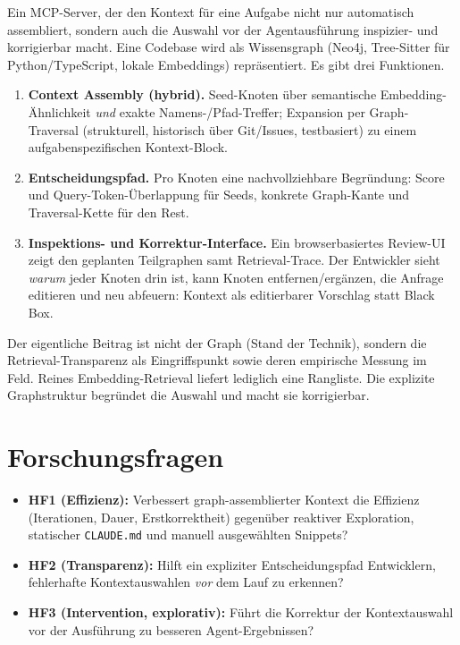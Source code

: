 \documentclass[11pt,a4paper]{scrartcl}
\newcommand{\code}[1]{\texttt{#1}}
\begin{document}
Ein MCP-Server, der den Kontext für eine Aufgabe nicht nur automatisch assembliert,
 sondern auch die Auswahl vor der Agentausführung inspizier- und korrigierbar macht. 
 Eine Codebase wird als Wissensgraph (Neo4j, Tree-Sitter für Python/TypeScript, 
 lokale Embeddings) repräsentiert. Es gibt drei Funktionen.

\begin{enumerate}
  \item \textbf{Context Assembly (hybrid).} Seed-Knoten über semantische Embedding-Ähnlichkeit
    \emph{und} exakte Namens-/Pfad-Treffer; Expansion per Graph-Traversal (strukturell,
    historisch über Git/Issues, testbasiert) zu einem aufgabenspezifischen Kontext-Block.
  \item \textbf{Entscheidungspfad.} Pro Knoten eine nachvollziehbare Begründung: Score und
    Query-Token-Überlappung für Seeds, konkrete Graph-Kante und Traversal-Kette für den Rest.
  \item \textbf{Inspektions- und Korrektur-Interface.} Ein browserbasiertes Review-UI zeigt den
    geplanten Teilgraphen samt Retrieval-Trace. Der Entwickler sieht \emph{warum} jeder Knoten
    drin ist, kann Knoten entfernen/ergänzen, die Anfrage editieren und neu abfeuern: Kontext
    als editierbarer Vorschlag statt Black Box.
\end{enumerate}

Der eigentliche Beitrag ist nicht der Graph (Stand der Technik), 
sondern die Retrieval-Transparenz als Eingriffspunkt sowie deren empirische Messung im Feld. 
Reines Embedding-Retrieval liefert lediglich eine Rangliste. 
Die explizite Graphstruktur begründet die Auswahl und macht sie korrigierbar.

\section{Forschungsfragen}

\begin{itemize}
  \item \textbf{HF1 (Effizienz):} Verbessert graph-assemblierter Kontext die Effizienz
    (Iterationen, Dauer, Erstkorrektheit) gegenüber reaktiver Exploration, statischer
    \code{CLAUDE.md} und manuell ausgewählten Snippets?
  \item \textbf{HF2 (Transparenz):} Hilft ein expliziter Entscheidungspfad Entwicklern,
    fehlerhafte Kontextauswahlen \emph{vor} dem Lauf zu erkennen?
  \item \textbf{HF3 (Intervention, explorativ):} Führt die Korrektur der Kontextauswahl vor der
    Ausführung zu besseren Agent-Ergebnissen?
\end{itemize}
\end{document}
